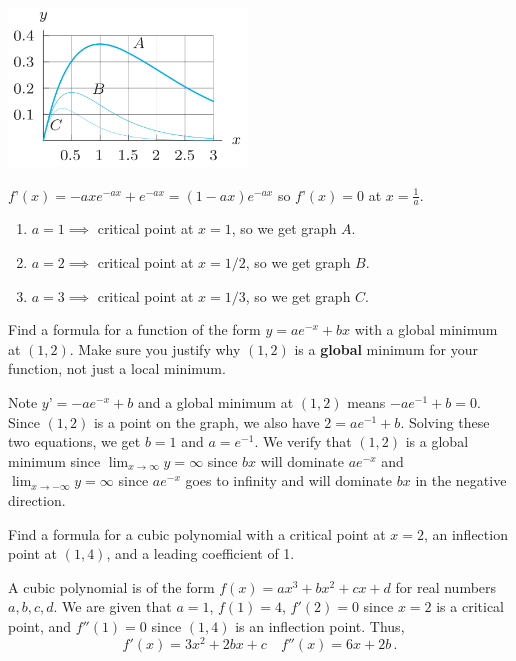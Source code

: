 \documentclass[11pt]{exam}
\begin{document}
\begin{questions}
\includegraphics[width=2.5in]{graph.png} 
\begin{solution}
  \(f’(x) = -axe^{-ax} + e^{-ax} = (1-ax)e^{-ax}\) so \(f’(x) = 0\) at
  \(x = \frac{1}{a}\).
  \begin{enumerate}
  \item \(a=1 \implies\) critical point at \(x=1\), so we get graph \(A\).
  \item \(a=2 \implies\) critical point at \(x=1/2\), so we get graph \(B\).
  \item \(a=3 \implies\) critical point at \(x=1/3\), so we get graph \(C\).
  \end{enumerate}
\end{solution}
   \question  Find a formula for a function of the form $y=ae^{-x} + bx$ with a global minimum at $(1,2)$.  Make sure you justify why $(1,2)$ is a \textbf{global} minimum for your function, not just a local minimum.
     \begin{solution}
       Note \(y’ = -ae^{-x}+b\) and a global minimum at \((1,2)\)
       means \(-ae^{-1}+b = 0\). Since \((1,2)\) is a point on the
       graph, we also have \(2 = ae^{-1}+b\). Solving these two
       equations, we get \(b = 1\) and \(a=e^{-1}\).
       We verify that \((1,2)\) is a global minimum since \(\lim_{x
         \to \infty} y = \infty\) since \(bx\) will dominate
       \(ae^{-x}\) and \(\lim_{x \to -\infty} y = \infty\) since
       \(ae^{-x}\) goes to infinity and will dominate \(bx\) in the
       negative direction.
     \end{solution}
\vspace{1in}
  \question  Find a formula for a cubic polynomial with a critical point at $x=2$, an inflection point at $(1,4)$, and a leading coefficient of 1. 
    \begin{solution}
      A cubic polynomial is of the form \(f(x) = ax^3+bx^2+cx+d\) for
      real numbers \(a,b,c,d\).
      We are given that \(a=1\), \(f(1) = 4\), \(f'(2) = 0\) since \(x=2\) is a
      critical point, and \(f''(1) = 0\) since \((1,4)\) is an
      inflection point. Thus,
      \[
        f'(x) = 3x^2+2bx+c \quad f''(x) = 6x + 2b \,.
\]
\end{solution}
\end{questions}
\end{document}
